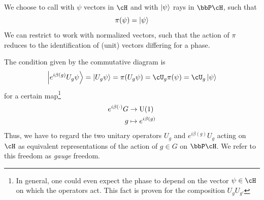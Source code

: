 We choose to call with $\psi$ vectors in $\cH$ and with $\ket{\psi}$ rays in $\bbP \cH$, such that
\begin{equation}
    \pi ( \psi) = \ket{\psi}
\end{equation}
We can restrict to work with normalized vectors, such that the action of $\pi$ reduces to the identification of (unit) vectors differing for a phase.
 
The condition given by the commutative diagram is
\begin{equation}
	\ket{ e^{i \beta(g)} U_g \psi } = \ket{U_{g} \psi} = \pi ( U_g \psi )  = \cU_g \pi (\psi) =   \cU_g  \ket{\psi} 
\end{equation}
for a certain map\footnote{In general, one could even expect the phase to depend on the vector $\psi \in \cH$ on which the operators act. This fact is proven for the composition $U_g U_{g'}$ }
\begin{equation}
    \begin{aligned}
        e^{i \beta(\cdot)}  G &\to \mathrm{U}(1)\\
        g &\mapsto e^{i \beta(g)}
    \end{aligned}
\end{equation}
Thus, we have to regard the two unitary operators $U_g$ and $e^{i \beta(g)} U_g$ acting on $\cH$ as equivalent representations of the action of $g \in G$ on $\bbP\cH$. We refer to this freedom as \textit{gauge} freedom. 

